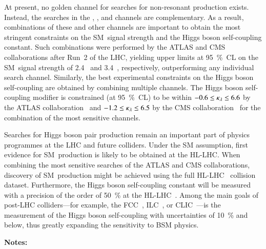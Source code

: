 At present, no golden channel for searches for non-resonant \HH production
exists. Instead, the searches in the \bbbb, \bbtautau, and \bbyy channels are
complementary. As a result, combinations of these and other channels are
important to obtain the most stringent constraints on the SM~\HH signal strength
and the Higgs boson self-coupling constant. Such combinations were performed by
the ATLAS and CMS collaborations after Run~2 of the LHC, yielding upper limits
at \SI{95}{\percent}~CL on the SM~\HH signal strength of 2.4~\cite{HDBS-2022-03}
and 3.4~\cite{CMS-HIG-22-001}, respectively, outperforming any individual search
channel. Similarly, the best experimental constraints on the Higgs boson
self-coupling are obtained by combining multiple channels. The Higgs boson
self-coupling modifier is constrained (at \SI{95}{\percent}~CL) to be within
$-0.6 \leq \kappa_{\lambda} \leq 6.6$ by the ATLAS collaboration~\cite{HDBS-2022-03} and
$-1.2 \leq \kappa_{\lambda} \leq 6.5$ by the CMS collaboration~\cite{CMS-HIG-22-001} for
the combination of the most sensitive channels.


Searches for Higgs boson pair production remain an important part of physics
programmes at the LHC and future colliders. Under the SM assumption, first
evidence for SM~\HH production is likely to be obtained at the HL-LHC. When
combining the most sensitive searches of the ATLAS and CMS collaborations,
discovery of SM~\HH production might be achieved using the full HL-LHC
\pp~collision dataset. Furthermore, the Higgs boson self-coupling constant will
be measured with a precision of the order of \SI{50}{\percent} at the
HL-LHC~\cite{DiMicco:2019ngk}. Among the main goals of post-LHC colliders---for
example, the FCC~\cite{FCC:2018byv}, ILC~\cite{Bambade:2019fyw}, or
CLIC~\cite{CLIC:2018fvx}---is the measurement of the Higgs boson self-coupling
with uncertainties of \SI{10}{\percent} and below, thus greatly expanding the
sensitivity to BSM physics.


\newpage\noindent\textbf{Notes:}\\





